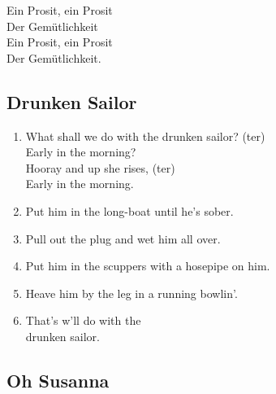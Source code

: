 \documentclass[a5paper]{article}
\begin{document}
Ein Prosit, ein Prosit \\
Der Gem\"{u}tlichkeit \\
Ein Prosit, ein Prosit \\
Der Gem\"{u}tlichkeit.\\

\newpage

\subsection{Drunken Sailor} %
\label{sub:drunken_sailor}


\begin{enumerate}
	\item What shall we do with the drunken sailor? (ter)\\
	Early in the morning?\\
	Hooray and up she rises, (ter)\\
	Early in the morning.\\
	\item Put him in the long-boat until he's sober.\\
	\item Pull out the plug and wet him all over.\\
	\item Put him in the scuppers with a hosepipe on him.\\
	\item Heave him by the leg in a running bowlin'.\\
	\item That's w'll do with the \\ drunken sailor.\\
\end{enumerate}



\newpage

\subsection{Oh Susanna} %
\label{sub:oh_susanna}
\end{document}

